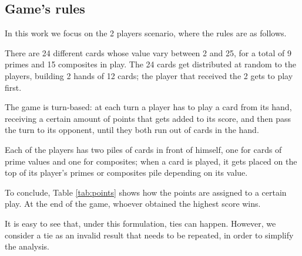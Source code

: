 \subsection{Game's rules}

In this work we focus on the 2 players scenario, where the rules are as follows.

There are 24 different cards whose value vary between 2 and 25, for a total of 9 primes and 15 composites in play.
The 24 cards get distributed at random to the players, building 2 hands of 12 cards; the player that received the 2 gets to play first.

The game is turn-based: at each turn a player has to play a card from its hand, receiving a certain amount of points that gets added to its score, and then pass the turn to its opponent, until they both run out of cards in the hand.

Each of the players has two piles of cards in front of himself, one for cards of prime values and one for composites; when a card is played, it gets placed on the top of its player's primes or composites pile depending on its value.

To conclude, Table \ref{tab:points} shows how the points are assigned to a certain play. At the end of the game, whoever obtained the highest score wins.

It is easy to see that, under this formulation, ties can happen. However, we consider a tie as an invalid result that needs to be repeated, in order to simplify the analysis.


